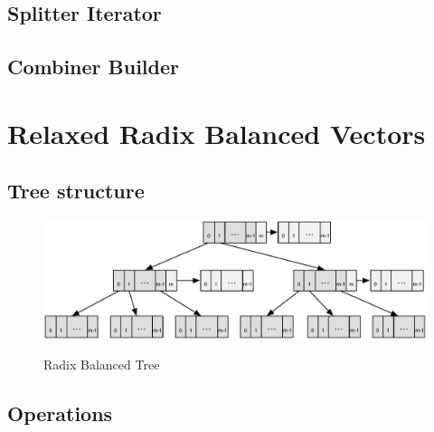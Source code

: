
\subsection{Splitter Iterator}



\subsection{Combiner Builder}




\section{Relaxed Radix Balanced Vectors}


\subsection{Tree structure}

\begin{figure}[h!]
  \centering
  \includegraphics[width=\textwidth]{Figures/Relaxed_Radix_balanced}
  \label{Relaxed_Radix_balanced}
  \caption{Radix Balanced Tree}
\end{figure}

\subsection{Operations}

